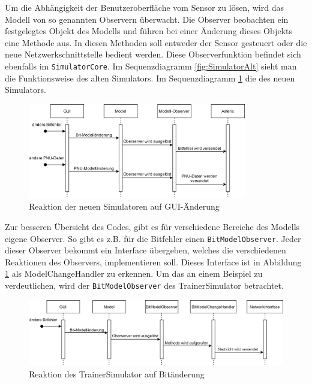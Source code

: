 Um die Abhängigkeit der Benutzeroberfläche vom Sensor zu lösen, wird das Modell von so genannten Observern überwacht. Die Observer beobachten ein festgelegtes Objekt des Modells und führen bei einer Änderung dieses Objekts eine Methode aus. In diesen Methoden soll entweder der Sensor gesteuert oder die neue Netzwerkschnittstelle bedient werden. Diese Observerfunktion befindet sich ebenfalls im \texttt{SimulatorCore}. Im Sequenzdiagramm \ref{fig:SimulatorAlt} sieht man die Funktionsweise des alten Simulators. Im Sequenzdiagramm \ref{fig:SimulatorNew} die des neuen Simulators.

\begin{figure}[ht]
    \centering
    \includegraphics[width=0.85\textwidth]{content/assets/Kapitel4/NeuerTestSimulator.png}
    \caption{Reaktion der neuen Simulatoren auf GUI-Änderung}
    \label{fig:SimulatorNew}
\end{figure}


Zur besseren Übersicht des Codes, gibt es für verschiedene Bereiche des Modells eigene Observer. So gibt es z.B. für die Bitfehler einen \texttt
{BitModelObserver}. Jeder dieser Observer bekommt ein Interface übergeben, welches die verschiedenen Reaktionen des Observers, implementieren soll. Dieses Interface ist in Abbildung \ref{fig:SimulatorNew} als ModelChangeHandler zu erkennen. Um das an einem Beispiel zu verdeutlichen, wird der \texttt{BitModelObserver} des TrainerSimulator betrachtet. 

\begin{figure}[ht]
    \centering
    \includegraphics[width=1\textwidth]{content/assets/Kapitel4/BitChangeBeispiel.png}
    \caption{Reaktion des TrainerSimulator auf Bitänderung}
    \label{fig:TrainerNewBit}
\end{figure}

